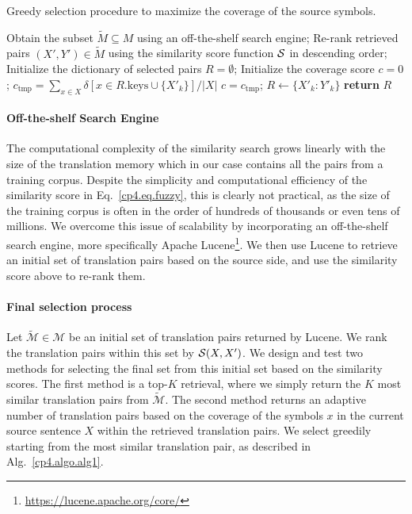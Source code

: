\begin{algorithm}[htpb]
\caption{Greedy selection procedure to maximize the coverage of the source symbols.} %
\label{cp4.algo.alg1}
\begin{algorithmic}[1]
\small
{}
\State Obtain the subset $\tilde{M}\subseteq M$ using an off-the-shelf search engine;
\State Re-rank retrieved pairs $\left(X', Y' \right) \in \tilde{M}$ using the similarity score function $\mathcal{S}$ in descending order;
\State Initialize the dictionary of selected pairs $R = \emptyset$; 
\State Initialize the coverage score $c=0$;
\State $c_{\text{tmp}}= \sum_{x \in X}\delta\left[ x \in R.\text{keys} \cup \{X'_k\}\right]/|X|$
\State $c = c_{\text{tmp}}$; $R \leftarrow \{X'_k: Y'_k\}$
\EndIf
\EndFor
\State \textbf{return} $R$
\end{algorithmic}
\end{algorithm}


\paragraph{Off-the-shelf Search Engine}

The computational complexity of the similarity search grows linearly with the size of the translation memory which in our case contains all the pairs from a training corpus. Despite the simplicity and computational efficiency of the similarity score in Eq.~\eqref{cp4.eq.fuzzy}, this is clearly not practical, as the size of the training corpus is often in the order of hundreds of thousands or even tens of millions. We overcome this issue of scalability by incorporating an off-the-shelf search engine, more specifically Apache Lucene\footnote{
\url{https://lucene.apache.org/core/}
}.
We then use Lucene to retrieve an initial set of translation pairs based on the source side, and use the similarity score above to re-rank them. 


\paragraph{Final selection process}
Let $\tilde{\mathcal{M}} \in \mathcal{M}$ be an initial set of translation pairs returned by Lucene. We rank the translation pairs within this set by $\mathcal{S}(X, X')$. We design and test two methods for selecting the final set from this initial set based on the similarity scores. The first method is a top-$K$ retrieval, where we simply return the $K$ most similar translation pairs from $\tilde{\mathcal{M}}$. The second method returns an adaptive number of translation pairs based on the coverage of the symbols $x$ in the current source sentence $X$ within the retrieved translation pairs. We select greedily starting from the most similar translation pair, as described in Alg.~\ref{cp4.algo.alg1}. 


